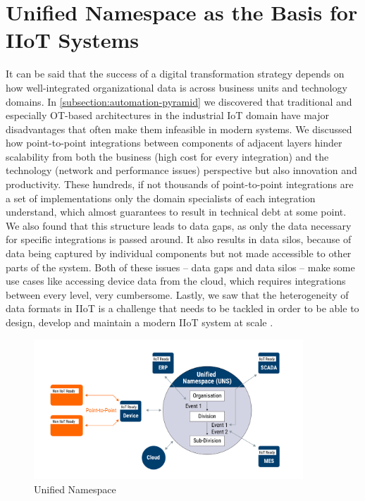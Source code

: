 \section{Unified Namespace as the Basis for IIoT Systems}
\label{section:unified-namespace}

    It can be said that the success of a digital transformation strategy depends on how well-integrated organizational data is across business units and technology domains. In \autoref{subsection:automation-pyramid} we discovered that traditional and especially OT-based architectures in the industrial IoT domain have major disadvantages that often make them infeasible in modern systems. We discussed how point-to-point integrations between components of adjacent layers hinder scalability from both the business (high cost for every integration) and the technology (network and performance issues) perspective but also innovation and productivity. These hundreds, if not thousands of point-to-point integrations are a set of implementations only the domain specialists of each integration understand, which almost guarantees to result in technical debt at some point. We also found that this structure leads to data gaps, as only the data necessary for specific integrations is passed around. It also results in data silos, because of data being captured by individual components but not made accessible to other parts of the system. Both of these issues -- data gaps and data silos -- make some use cases like accessing device data from the cloud, which requires integrations between every level, very cumbersome. Lastly, we saw that the heterogeneity of data formats in IIoT is a challenge that needs to be tackled in order to be able to design, develop and maintain a modern IIoT system at scale \cite{hivemq_essentials_uns}.

    \begin{figure}[htbp]
        \centering
        \includegraphics[width=0.9\textwidth]{img/uns-basic-architecture.png}
        \caption{Unified Namespace \cite{hivemq_essentials_uns}}
        \label{figure:hivemq-uns-essentials}
    \end{figure}
    
